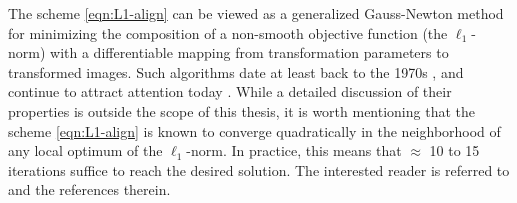 The scheme \eqref{eqn:L1-align} can be viewed as a generalized Gauss-Newton
method for minimizing the composition of a non-smooth objective function (the
$\ell_1$-norm) with a differentiable mapping from transformation parameters to
transformed images. Such algorithms date at least back to the 1970s
\cite{Cromme1978-NM,Jittorntrum1980-NM}, and continue to attract attention
today \cite{lewis2008proximal}. While a detailed discussion of their properties is
outside the scope of this thesis, it is worth mentioning that the scheme
\eqref{eqn:L1-align} is known to converge quadratically in the neighborhood of
any local optimum of the $\ell_1$-norm. In practice, this means that $\approx$
10 to 15 iterations suffice to reach the desired solution. The
interested reader is referred to \cite{Jittorntrum1980-NM,Osborne1990-JAMSSB} and the
references therein.


